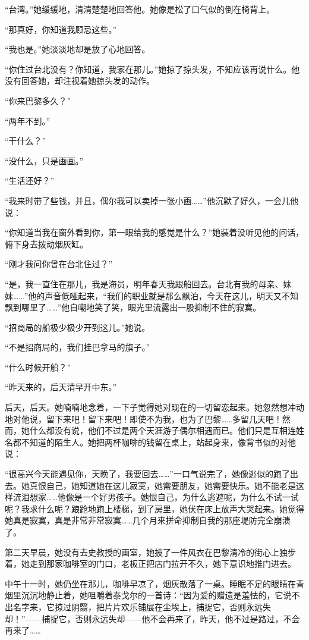 \par “台湾。”她缓缓地，清清楚楚地回答他。她像是松了口气似的倒在椅背上。
\par “那真好，你知道我顾忌这些。”
\par “我也是。”她淡淡地却是放了心地回答。
\par “你住过台北没有？你知道，我家在那儿。”她掠了掠头发，不知应该再说什么。他没有回答她，却注视着她掠头发的动作。
\par “你来巴黎多久？”
\par “两年不到。”
\par “干什么？”
\par “没什么，只是画画。”
\par “生活还好？”
\par “我来时带了些钱，并且，偶尔我可以卖掉一张小画……”他沉默了好久，一会儿他说：
\par “你知道当我在窗外看到你，第一眼给我的感觉是什么？”她装着没听见他的问话，俯下身去拨动烟灰缸。
\par “刚才我问你曾在台北住过？”
\par “是，我一直住在那儿，我是海员，明年春天我跟船回去。台北有我的母亲、妹妹……”他的声音低哑起来，“我们的职业就是那么飘泊，今天在这儿，明天又不知飘到哪里了……”他自嘲地笑了笑，眼光里流露出一股抑制不住的寂寞。
\par “招商局的船极少极少开到这儿。”她说。
\par “不是招商局的，我们挂巴拿马的旗子。”
\par “什么时候开船？”
\par “昨天来的，后天清早开中东。”
\par 后天，后天。她喃喃地念着，一下子觉得她对现在的一切留恋起来。她忽然想冲动地对他说，留下来吧！留下来吧！即使不为我，也为了巴黎……多留几天吧！然而，她什么都没有说，他们不过是两个天涯游子偶尔相遇而已。他们只是互相连姓名都不知道的陌生人。她把两杯咖啡的钱留在桌上，站起身来，像背书似的对他说：
\par “很高兴今天能遇见你，天晚了，我要回去……”一口气说完了，她像逃似的跑了出去。她真恨自己，她知道她在这儿寂寞，她需要朋友，她需要快乐。她不能老是这样流泪想家……他像是一个好男孩子。她恨自己，为什么逃避呢，为什么不试一试呢？我求什么呢？踉跄地跑上楼梯，到了房里，她伏在床上放声大哭起来。她觉得她真是寂寞，真是非常非常寂寞……几个月来拼命抑制自我的那座堤防完全崩溃了。
\par 第二天早晨，她没有去史教授的画室，她披了一件风衣在巴黎清冷的街心上独步着，她走到那家咖啡室的门口，老板正把店门拉开不久，她下意识地推门进去。
\par 中午十一时，她仍坐在那儿，咖啡早凉了，烟灰散落了一桌。睡眠不足的眼睛在青烟里沉沉地静止着，她咀嚼着泰戈尔的一首诗：“因为爱的赠遗是羞怯的，它说不出名字来，它掠过阴翳，把片片欢乐铺展在尘埃上，捕捉它，否则永远失却！”——捕捉它，否则永远失却——他不会再来了，昨天，他不过是路过，不会再来了……

